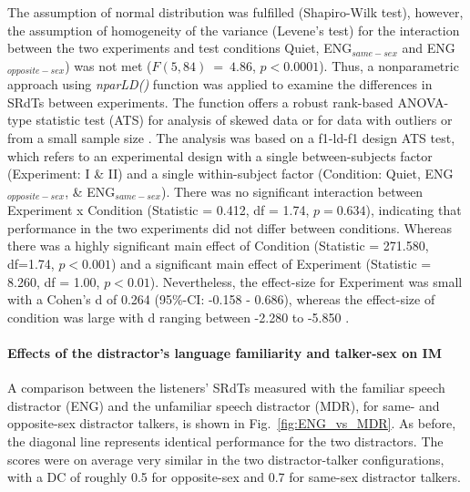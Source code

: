\documentclass[a4paper, twoside]{templates/ociamthesis}
\begin{document}
The assumption of normal distribution was fulfilled (Shapiro-Wilk test), however, the assumption of homogeneity of the variance (Levene's test) for the interaction between the two experiments and test conditions Quiet, ENG\(_{same-sex}\) and ENG\(_{ opposite-sex}\)) was not met (\(F(5,84)~=~4.86\), \(p < 0.0001\)). Thus, a nonparametric approach using \textit{nparLD()} function \autocite[nparLD package;][]{nparLDPackageR} was applied to examine the differences in SRdTs between experiments. The function offers a robust rank-based ANOVA-type statistic test (ATS) for analysis of skewed data or for data with outliers or from a small sample size \autocite[see][for a good introduction on robust nonparametric techniques]{Feys2016}. The analysis was based on a f1-ld-f1 design ATS test, which refers to an experimental design with a single between-subjects factor (Experiment: I \& II) and a single within-subject factor (Condition: Quiet, ENG\(_{opposite-sex}\), \& ENG\(_{same-sex}\)). There was no significant interaction between Experiment x Condition (Statistic = 0.412, df = 1.74, \(p = 0.634\)), indicating that performance in the two experiments did not differ between conditions. Whereas there was a highly significant main effect of Condition (Statistic = 271.580, df=1.74, \(p < 0.001\)) and a significant main effect of Experiment (Statistic = 8.260, df = 1.00, \(p < 0.01\)). Nevertheless, the effect-size for Experiment was small with a Cohen's d of 0.264 (95\%-CI: -0.158 - 0.686), whereas the effect-size of condition was large with d ranging between -2.280 to -5.850 \autocite[\textit{effsize::cohen.d()};][]{effsizeRPackage}.\\

\hypertarget{effects-of-the-distractors-language-familiarity-and-talker-sex-on-im}{%
\paragraph{Effects of the distractor's language familiarity and talker-sex on IM}\label{effects-of-the-distractors-language-familiarity-and-talker-sex-on-im}}

\hfill\break
A comparison between the listeners' SRdTs measured with the familiar speech distractor (ENG) and the unfamiliar speech distractor (MDR), for same- and opposite-sex distractor talkers, is shown in Fig.~\ref{fig:ENG_vs_MDR}. As before, the diagonal line represents identical performance for the two distractors. The scores were on average very similar in the two distractor-talker configurations, with a DC of roughly 0.5 for opposite-sex and 0.7 for same-sex distractor talkers.\\
\end{document}
